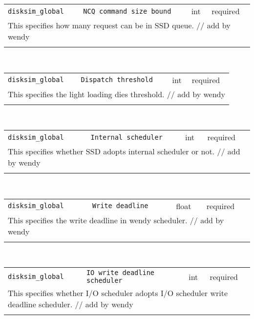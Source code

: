 \noindent 
\begin{tabular}{|p{\lpmodwidth}|p{\lpnamewidth}|p{0.5in}|p{0.5in}|}
\cline{1-4}
\texttt{disksim\_global} & \texttt{NCQ command size bound} & int & required \\ 
\cline{1-4}
\multicolumn{4}{|p{6in}|}{
This specifies how many request can be in SSD queue. // add by wendy
}\\ 
\cline{1-4}
\multicolumn{4}{p{5in}}{}\\
\end{tabular}\\ 
\noindent 
\begin{tabular}{|p{\lpmodwidth}|p{\lpnamewidth}|p{0.5in}|p{0.5in}|}
\cline{1-4}
\texttt{disksim\_global} & \texttt{Dispatch threshold} & int & required \\ 
\cline{1-4}
\multicolumn{4}{|p{6in}|}{
This specifies the light loading dies threshold. // add by wendy
}\\ 
\cline{1-4}
\multicolumn{4}{p{5in}}{}\\
\end{tabular}\\ 
\noindent 
\begin{tabular}{|p{\lpmodwidth}|p{\lpnamewidth}|p{0.5in}|p{0.5in}|}
\cline{1-4}
\texttt{disksim\_global} & \texttt{Internal scheduler} & int & required \\ 
\cline{1-4}
\multicolumn{4}{|p{6in}|}{
This specifies whether SSD adopts internal scheduler or not. // add by wendy
}\\ 
\cline{1-4}
\multicolumn{4}{p{5in}}{}\\
\end{tabular}\\ 
\noindent 
\begin{tabular}{|p{\lpmodwidth}|p{\lpnamewidth}|p{0.5in}|p{0.5in}|}
\cline{1-4}
\texttt{disksim\_global} & \texttt{Write deadline} & float & required \\ 
\cline{1-4}
\multicolumn{4}{|p{6in}|}{
This specifies the write deadline in wendy scheduler. // add by wendy
}\\ 
\cline{1-4}
\multicolumn{4}{p{5in}}{}\\
\end{tabular}\\ 
\noindent 
\begin{tabular}{|p{\lpmodwidth}|p{\lpnamewidth}|p{0.5in}|p{0.5in}|}
\cline{1-4}
\texttt{disksim\_global} & \texttt{IO write deadline scheduler} & int & required \\ 
\cline{1-4}
\multicolumn{4}{|p{6in}|}{
This specifies whether I/O scheduler adopts I/O scheduler write deadline scheduler. // add by wendy
}\\ 
\cline{1-4}
\multicolumn{4}{p{5in}}{}\\
\end{tabular}\\ 
